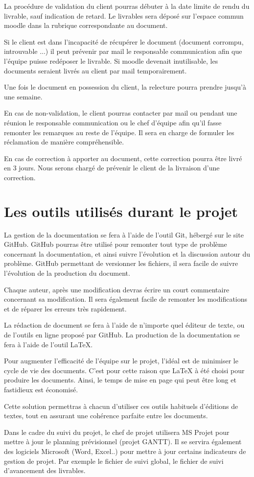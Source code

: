 La procédure de validation du client pourras débuter à la date limite de rendu du livrable, sauf indication de retard. Le livrables sera déposé sur l'espace commun moodle dans la rubrique correspondante au document.

Si le client est dans l’incapacité de récupérer le document (document corrompu, introuvable ...) il peut prévenir par mail le responsable communication afin que l’équipe puisse redéposer le livrable.
Si moodle devenait inutilisable, les documents seraient livrés au client par mail temporairement.

Une fois le document en possession du client, la relecture pourra prendre jusqu’à une semaine.

En cas de non-validation, le client pourras contacter par mail ou pendant une réunion le responsable communication ou le chef d’équipe afin qu’il fasse remonter les remarques au reste de l’équipe.
Il sera en charge de formuler les réclamation de manière compréhensible.

En cas de correction à apporter au document, cette correction pourra être livré en 3 jours.
Nous serons chargé de prévenir le client de la livraison d’une correction.

\section{Les outils utilisés durant le projet}

La gestion de la documentation se fera à l’aide de l’outil Git, hébergé sur le site GitHub.
GitHub pourras être utilisé pour remonter tout type de problème concernant la documentation, et ainsi suivre l'évolution et la discussion autour du problème.
GitHub permettant de versionner les fichiers, il sera facile de suivre l'évolution de la production du document.

Chaque auteur, après une modification devras écrire un court commentaire concernant sa modification.
Il sera également facile de remonter les modifications et de réparer les erreurs très rapidement.

La rédaction de document se fera à l’aide de n’importe quel éditeur de texte, ou de l'outils en ligne proposé par GitHub.
La production de la documentation se fera à l’aide de l'outil LaTeX.

Pour augmenter l'efficacité de l'équipe sur le projet, l’idéal est de minimiser le cycle de vie des documents.
C'est pour cette raison que LaTeX à été choisi pour produire les documents.
Ainsi, le temps de mise en page qui peut être long et fastidieux est économisé.

Cette solution permettras à chacun  d’utiliser ces outils habituels d’éditions de textes, tout en assurant une cohérence parfaite entre les documents.

Dans le cadre du suivi du projet, le chef de projet utilisera MS Projet pour mettre à jour le planning 
prévisionnel (projet GANTT). Il se servira également des logiciels Microsoft (Word, Excel..) pour mettre à jour certains indicateurs de gestion de projet. Par exemple le fichier de suivi global, le fichier de suivi d'avancement des livrables.
